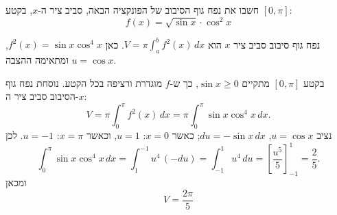 
\begin{question}
חשבו את נפח גוף הסיבוב של הפונקציה הבאה, סביב ציר ה-$x$, בקטע $[0,\pi]$:
\[ f(x)=\sqrt{\sin x}\cdot\cos^2x \]
\end{question}

\begin{hint}
נפח גוף סיבוב סביב ציר $x$ הוא $V=\pi\int_a^b f^2(x)\,dx$. כאן $f^2(x)=\sin x\cos^4x$, ומתאימה ההצבה $u=\cos x$.
\end{hint}

\begin{solution}
בקטע $[0,\pi]$ מתקיים $\sin x\ge0$, כך ש-$f$ מוגדרת ורציפה בכל הקטע. נוסחת נפח גוף הסיבוב סביב ציר ה-$x$:
\[ V=\pi\int_0^{\pi}f^2(x)\,dx=\pi\int_0^{\pi}\sin x\cos^4x\,dx. \]
נציב $u=\cos x$, $du=-\sin x\,dx$; כאשר $x=0$: $u=1$, וכאשר $x=\pi$: $u=-1$. לכן
\[ \int_0^{\pi}\sin x\cos^4x\,dx=\int_{1}^{-1}u^4\,(-du)=\int_{-1}^{1}u^4\,du=\left[\frac{u^5}{5}\right]_{-1}^{1}=\frac25. \]
ומכאן
\[ \boxed{V=\frac{2\pi}{5}} \]
\end{solution}
